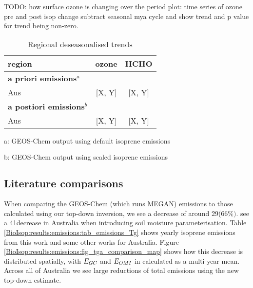     TODO: how surface ozone is changing over the period
    plot: time series of ozone pre and post isop change
    subtract seasonal mya cycle and show trend and p value for trend being non-zero.
    
    \begin{table}\begin{threeparttable}
      \caption{Regional deseasonalised trends}
      \begin{tabular}{ l  c  c } 
        \toprule
        region & ozone & HCHO \\
        \midrule
        \textbf{a priori emissions}$^a$ & & \\
        Aus & [X, Y] & [X, Y] \\ 
        \midrule
        \textbf{a postiori emissions}$^b$ & & \\
        Aus & [X, Y] & [X, Y] \\ 
        \bottomrule
      \end{tabular}
      \begin{tablenotes} 
        \item a: GEOS-Chem output using default isoprene emissions
        \item b: GEOS-Chem output using scaled isoprene emissions
      \end{tablenotes}
    \end{threeparttable}\end{table}
    
  \subsection{Literature comparisons}
    
    When comparing the GEOS-Chem (which runs MEGAN) emissions to those calculated using our top-down inversion, we see a decrease of around 29\tgpyr ($66\%)$.
    \textcite{Sindelarova2014} see a 41\tgpyr decrease in Australia when introducing soil moisture parameterisation.
    Table \ref{BioIsop:results:emissions:tab_emissions_Tg} shows yearly isoprene emissions from this work and some other works for Australia.
    Figure \ref{BioIsop:results:emissions:fig_tga_comparison_map} shows how this decrease is distributed spatially, with $E_{GC}$ and $E_{OMI}$ in \tgpyr calculated as a multi-year mean.
    Across all of Australia we see large reductions of total emissions using the new top-down estimate.
    
    
